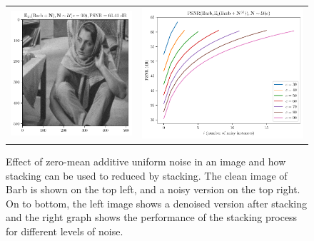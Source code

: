 \documentclass{article}
\begin{document}
\begin{enumerate}
\begin{figure}
{\begin{tabular}{cc}
        \includegraphics{denoised_0MAUN_barb} & \includegraphics{PSNR_0MAUN_barb}
      \end{tabular}
    }
    \caption{Effect of zero-mean additive uniform noise in an image
      and how stacking can be used to reduced by stacking. The clean
      image of Barb is shown on the top left, and a noisy version on
      the top right. On to bottom, the left image shows a denoised
      version after stacking and the right graph shows the performance
      of the stacking process for different levels of
      noise.\label{fig:0MAUN}}
  \end{figure}


\end{enumerate}
\end{document}
